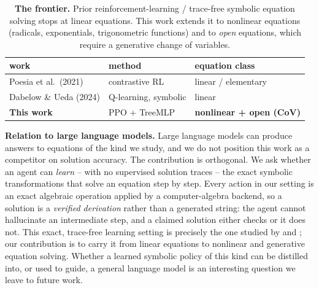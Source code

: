 
\begin{table}[h]
\centering
\small
\begin{tabular}{lll}
\toprule
work & method & equation class \\
\midrule
Poesia et al.\ (2021)      & contrastive RL          & linear / elementary \\
Dabelow \& Ueda (2024)     & Q-learning, symbolic    & linear \\
\textbf{This work}         & PPO + TreeMLP           & \textbf{nonlinear + open (CoV)} \\
\bottomrule
\end{tabular}
\caption{\textbf{The frontier.} Prior reinforcement-learning / trace-free
symbolic equation solving stops at linear equations. This work extends it to
nonlinear equations (radicals, exponentials, trigonometric functions) and to
\emph{open} equations, which require a generative change of variables.}
\label{tab:frontier}
\end{table}

\textbf{Relation to large language models.}
Large language models can produce answers to equations of the kind we study,
and we do not position this work as a competitor on solution accuracy. The
contribution is orthogonal. We ask whether an agent can \emph{learn} -- with
no supervised solution traces -- the exact symbolic transformations that
solve an equation step by step. Every action in our setting is an exact
algebraic operation applied by a computer-algebra backend, so a solution is a
\emph{verified derivation} rather than a generated string: the agent cannot
hallucinate an intermediate step, and a claimed solution either checks or it
does not. This exact, trace-free learning setting is precisely the one
studied by \citet{poesia2021contrastive} and \citet{dabelow2024symbolic};
our contribution is to carry it from linear equations to nonlinear and
generative equation solving. Whether a learned symbolic policy of this kind
can be distilled into, or used to guide, a general language model is an
interesting question we leave to future work.
